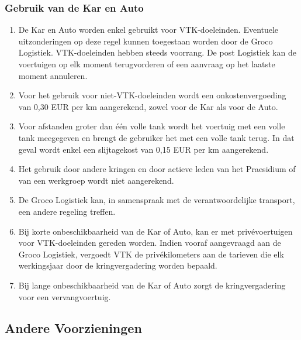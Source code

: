     \subsubsection{Gebruik van de Kar en Auto}
    \begin{enumerate}
    \item De Kar en Auto worden enkel gebruikt voor VTK-doeleinden. Eventuele
    uitzonderingen op deze regel kunnen toegestaan worden door de Groco Logistiek. VTK-doeleinden hebben steeds voorrang. De post Logistiek kan de voertuigen op elk moment terugvorderen of een aanvraag op het laatste moment annuleren.
    \item Voor het gebruik voor niet-VTK-doeleinden wordt een onkostenvergoeding van 0,30 EUR per km aangerekend, zowel voor de Kar als voor de Auto. 
    \item Voor afstanden groter dan één volle tank wordt het voertuig met een volle tank meegegeven en brengt de gebruiker het met een volle tank terug. In dat geval wordt enkel een slijtagekost van 0,15 EUR per km aangerekend.
    \item Het gebruik door andere kringen en door actieve leden van het Praesidium of van een werkgroep wordt niet aangerekend.
    \item De Groco Logistiek kan, in samenspraak met de verantwoordelijke transport, een andere regeling treffen.
    \item Bij korte onbeschikbaarheid van de Kar of Auto, kan er met priv\'evoertuigen voor VTK-doeleinden gereden worden. Indien vooraf aangevraagd aan de Groco Logistiek, vergoedt VTK de priv\'ekilometers aan de tarieven die elk werkingsjaar door de kringvergadering worden bepaald.
    \item Bij lange onbeschikbaarheid van de Kar of Auto zorgt de kringvergadering voor een vervangvoertuig.
    \end{enumerate}

\subsection{Andere Voorzieningen}

